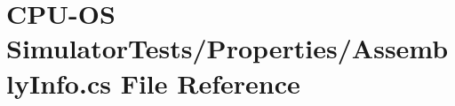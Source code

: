 \hypertarget{_c_p_u-_o_s_01_simulator_tests_2_properties_2_assembly_info_8cs}{}\section{C\+P\+U-\/\+O\+S Simulator\+Tests/\+Properties/\+Assembly\+Info.cs File Reference}
\label{_c_p_u-_o_s_01_simulator_tests_2_properties_2_assembly_info_8cs}
